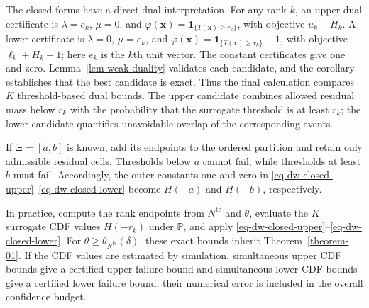 \documentclass[review,11pt,3p,authoryear,nopreprintline]{elsarticle}
\begin{document}
The closed forms have a direct dual interpretation. For any rank $k$, an upper dual certificate is $\lambda=e_k$, $\mu=0$, and $\varphi(\bm x)=\mathbf1_{\{T(\bm x)\ge r_k\}}$, with objective $u_k+H_k$. A lower certificate is $\lambda=0$, $\mu=e_k$, and $\varphi(\bm x)=\mathbf1_{\{T(\bm x)\ge r_k\}}-1$, with objective $\ell_k+H_k-1$; here $e_k$ is the $k$th unit vector. The constant certificates give one and zero. Lemma~\ref{lem-weak-duality} validates each candidate, and the corollary establishes that the best candidate is exact. Thus the final calculation compares $K$ threshold-based dual bounds. The upper candidate combines allowed residual mass below $r_k$ with the probability that the surrogate threshold is at least $r_k$; the lower candidate quantifies unavoidable overlap of the corresponding events.

\begin{remark}
  \label{rem-interval-support}
  If $\Xi=[a,b]$ is known, add its endpoints to the ordered partition and retain only admissible residual cells. Thresholds below $a$ cannot fail, while thresholds at least $b$ must fail. Accordingly, the outer constants one and zero in \eqref{eq-dw-closed-upper}--\eqref{eq-dw-closed-lower} become $H(-a)$ and $H(-b)$, respectively.
\end{remark}

In practice, compute the rank endpoints from $N^{\mathrm{te}}$ and $\theta$, evaluate the $K$ surrogate CDF values $H(-r_k)$ under $\mathbb P$, and apply \eqref{eq-dw-closed-upper}--\eqref{eq-dw-closed-lower}. For $\theta\ge\theta_{N^{\mathrm{te}}}(\delta)$, these exact bounds inherit Theorem~\ref{theorem-01}. If the CDF values are estimated by simulation, simultaneous upper CDF bounds give a certified upper failure bound and simultaneous lower CDF bounds give a certified lower failure bound; their numerical error is included in the overall confidence budget.



\end{document}
